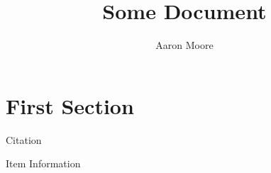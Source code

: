 \documentclass{article}
\title{Some Document}
\author{Aaron Moore}
\date{}
\begin{document}
\maketitle
\section{First Section}
Citation \cite{itemid}

\pagebreak{}
\begin{thebibliography}{9}
		Item Information

\end{thebibliography}
\end{document}
